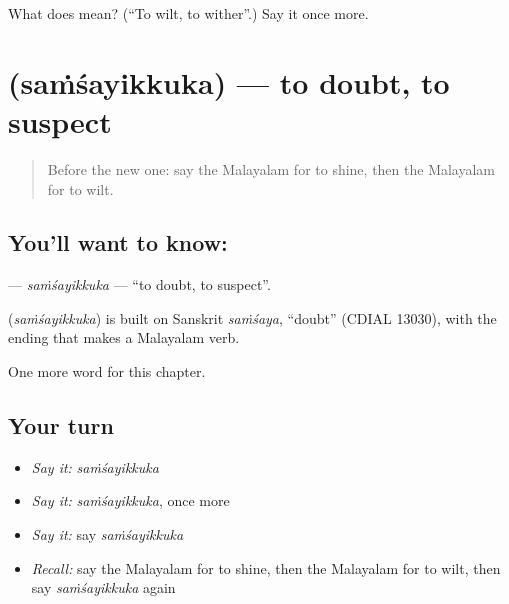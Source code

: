 \begin{tcolorbox}[breakable,colback=teal!4,colframe=teal!35!black,title={Before you move on}]
What does  mean? (\textquotedblleft{}To wilt, to wither\textquotedblright{}.) Say it once more.
\end{tcolorbox}
\section[\texorpdfstring{\ml{സംശയിക്കുക} (saṁśayikkuka)}{സംശയിക്കുക (saṁśayikkuka)}]{ (saṁśayikkuka) — to doubt, to suspect}

\label{lesson:ML-C229-samsayikkuka}



\begin{quote}
Before the new one: say the Malayalam for to shine, then the Malayalam for to wilt.
\end{quote}

\subsection*{You'll want to know: }
\textbf{} — \emph{saṁśayikkuka} — \textquotedblleft{}to doubt, to suspect\textquotedblright{}.

\begin{cousinweb}
\textbf{} (\emph{saṁśayikkuka}) is built on Sanskrit \emph{saṁśaya}, \textquotedblleft{}doubt\textquotedblright{} (CDIAL 13030), with the ending that makes a Malayalam verb.
\end{cousinweb}

\begin{grammarlens}[title={What you've built}]
One more word for this chapter.
\end{grammarlens}

\subsection*{Your turn}
\begin{itemize}
\raggedright
  \item \emph{Say it:} \emph{saṁśayikkuka}
  \item \emph{Say it:} \emph{saṁśayikkuka}, once more
  \item \emph{Say it:} say \emph{saṁśayikkuka}
  \item \emph{Recall:} say the Malayalam for to shine, then the Malayalam for to wilt, then say \emph{saṁśayikkuka} again
\end{itemize}

